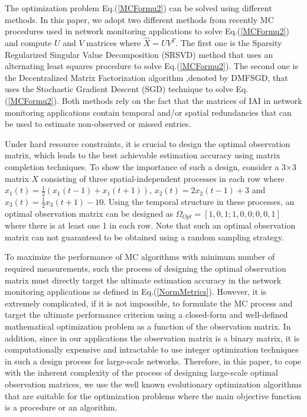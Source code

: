 The optimization problem Eq.(\ref{MCFormu2}) can be solved using different methods. In this paper, we adopt two different methods from recently MC procedures used in network monitoring applications to solve Eq.(\ref{MCFormu2}) and compute $U$ and $V$ matrices where $\hat{X}=UV^{T}$. The first one is the Sparsity Regularized Singular Value Decomposition (SRSVD) method \cite{Roughan:2012} that uses an alternating least squares procedure to solve Eq.(\ref{MCFormu2}). The second one is the Decentralized Matrix Factorization algorithm \cite{YLiao:2011},denoted by DMFSGD, that uses the Stochastic Gradient Descent (SGD) technique to solve Eq.(\ref{MCFormu2}). Both methods rely on the fact that the matrices of IAI in network monitoring applications contain temporal and/or spatial redundancies that can be used to estimate non-observed or missed entries.

Under hard resource constraints, it is crucial to design the optimal observation matrix, which leads to the best achievable estimation accuracy using matrix completion techniques. To show the importance of such a design, consider a 3$\times$3 matrix $X$ consisting of three spatial-independent processes in each row where $x_{1}(t)=\frac{1}{2}(x_{1}(t-1)+x_{1}(t+1))$, $x_{2}(t)=2x_{2}(t-1)+3$ and $x_{3}(t)=\frac{1}{2} x_{3}(t+1)-10$. Using the temporal structure in these processes, an optimal observation matrix can be designed as $\Omega_{Opt}=[1, 0, 1; 1, 0, 0; 0, 0, 1]$ where there is at least one 1 in each row. Note that such an optimal observation matrix can not guaranteed to be obtained using a random sampling strategy.

To maximize the performance of MC algorithms with minimum number of required measurements, such the process of designing the optimal observation matrix must directly target the ultimate estimation accuracy in the network monitoring applications as defined in Eq.(\ref{NormMetrics}). However, it is extremely complicated, if it is not impossible, to formulate the MC process and target the ultimate performance criterion using a closed-form and well-defined mathematical optimization problem as a function of the observation matrix. In addition, since in our applications the observation matrix is a binary matrix, it is computationally expensive and intractable to use integer optimization techniques in such a design process for large-scale networks. Therefore, in this paper, to cope with the inherent complexity of the process of designing large-scale optimal observation matrices, we use the well known evolutionary optimization algorithms that are suitable for the optimization problems where the main objective function is a procedure or an algorithm.

